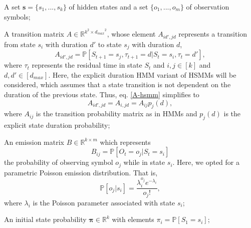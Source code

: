 \documentclass[extendedabs]{recpad2k}
\begin{document}
    \textbullet  A set $\mathbf{s}=\{s_1,...,s_k\}$ of hidden states and a set $\{o_1,...,o_m\}$ of observation symbols;
    
    \textbullet  A transition matrix ${A}\in \mathbb{R}^{k^2 \times {d_{max}}^2}$, whose element $A_{id',jd}$ represents a transition from state $s_i$ with duration $d'$ to state $s_j$ with duration $d$,
    \begin{equation}
        A_{id',jd} = \mathbb{P}[S_{t+1}=s_j, \tau_{t+1}=d|S_t=s_i, \tau_t=d'],
        \label{A-hsmm}
    \end{equation}
    where $\tau_t$ represents the residual time in state $S_t$ and  $i,j \in [k]$ and $d,d' \in  [d_{max}]$. Here, the explicit duration HMM variant of HSMMs will be considered, which assumes that a state transition is not dependent on the duration of the previous state. Thus, eq. \eqref{A-hsmm} simplifies to
    \begin{equation}
        A_{id',jd} = A_{i,jd} = A_{ij}p_j(d),
    \end{equation}
    where $A_{ij}$ is the transition probability matrix as in HMMs and $p_j(d)$ is the explicit state duration probability;
    
    \textbullet  An emission matrix $B\in\mathbb{R}^{k\times m}$ which represents
    \begin{equation}
        B_{ij}=\mathbb{P}[O_t=o_j|S_t=s_i]
    \end{equation}
    the probability of observing symbol $o_j$ while in state $s_i$.  Here, we opted for a parametric Poisson emission distribution. That is,
    \begin{equation}
        \mathbb{P}[o_j|s_i] = \dfrac{\lambda_i^{o_j} e^{-\lambda_i}}{o_j!},
        \label{poisson}
    \end{equation}
    where $\lambda_i$ is the Poisson parameter associated with state $s_i$;
    
    \textbullet  An initial state probability $\boldsymbol{\pi}\in\mathbb{R}^{k}$ with elements $\pi_i=\mathbb{P}[S_1=s_i]$;
    
\end{document}
